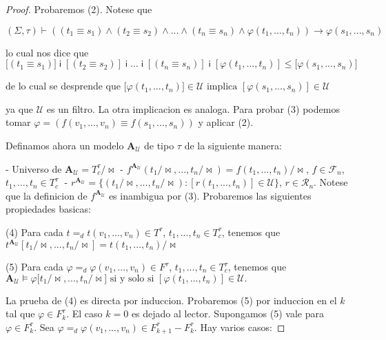 \begin{proof}
    Probaremos (2). Notese que

    \(\displaystyle (\Sigma ,\tau )\vdash \left( (t_{1}\equiv s_{1})\wedge (t_{2}\equiv s_{2})\wedge ...\wedge (t_{n}\equiv s_{n})\wedge \varphi (t_{1},...,t_{n})\right) \rightarrow \varphi (s_{1},...,s_{n}) \)

    lo cual nos dice que
    \(\displaystyle \lbrack (t_{1}\equiv s_{1})]\;\mathsf{i\;}[(t_{2}\equiv s_{2})]\;\mathsf{i\;} ...\;\mathsf{i\;}[(t_{n}\equiv s_{n})]\;\mathsf{i\;}[\varphi (t_{1},...,t_{n})]\leq \lbrack \varphi (s_{1},...,s_{n})] \)

    de lo cual se desprende que
    \(\displaystyle \lbrack \varphi (t_{1},...,t_{n})]\in \mathcal{U}\text{ implica }[\varphi (s_{1},...,s_{n})]\in \mathcal{U} \)

    ya que \(\mathcal{U}\) es un filtro. La otra implicacion es analoga.
    Para probar (3) podemos tomar \(\varphi =\left( f(v_{1},...,v_{n})\equiv f(s_{1},...,s_{n})\right) \) y aplicar (2).

    Definamos ahora un modelo \(\mathbf{A}_{\mathcal{U}}\) de tipo \(\tau \) de la siguiente manera:

    - Universo de \(\mathbf{A}_{\mathcal{U}}=T_{c}^{\tau }/\mathrm{\bowtie }\)
    - \(f^{\mathbf{A}_{\mathcal{U}}}(t_{1}/\mathrm{\bowtie },...,t_{n}/ \mathrm{\bowtie })=f(t_{1},...,t_{n})/\mathrm{\bowtie }\), \(f\in \mathcal{F} _{n}\), \(t_{1},...,t_{n}\in T_{c}^{\tau }\;\)
    - \(r^{\mathbf{A}_{\mathcal{U}}}=\{(t_{1}/\mathrm{\bowtie },...,t_{n}/ \mathrm{\bowtie }):[r(t_{1},...,t_{n})]\in \mathcal{U}\}\), \(r\in \mathcal{R} _{n}.\)
    Notese que la definicion de \(f^{\mathbf{A}_{\mathcal{U}}}\) es inambigua por (3). Probaremos las siguientes propiedades basicas:

    (4) Para cada \(t=_{d}t(v_{1},...,v_{n})\in T^{\tau }\), \( t_{1},...,t_{n}\in T_{c}^{\tau }\), tenemos que
    \(\displaystyle t^{\mathbf{A}_{\mathcal{U}}}[t_{1}/\mathrm{\bowtie },...,t_{n}/\mathrm{ \bowtie }]=t(t_{1},...,t_{n})/\mathrm{\bowtie } \)

    (5) Para cada \(\varphi =_{d}\varphi (v_{1},...,v_{n})\in F^{\tau }\), \( t_{1},...,t_{n}\in T_{c}^{\tau }\), tenemos que
    \(\displaystyle \mathbf{A}_{\mathcal{U}}\models \varphi \lbrack t_{1}/\mathrm{\bowtie } ,...,t_{n}/\mathrm{\bowtie }]\text{ si y solo si }[\varphi (t_{1},...,t_{n})]\in \mathcal{U}. \)

    La prueba de (4) es directa por induccion. Probaremos (5) por induccion en el \(k\) tal que \(\varphi \in F_{k}^{\tau }\). El caso \(k=0\) es dejado al lector. Supongamos (5) vale para \(\varphi \in F_{k}^{\tau }\). Sea \(\varphi =_{d}\varphi (v_{1},...,v_{n})\in F_{k+1}^{\tau }-F_{k}^{\tau }.\) Hay varios casos:


\end{proof}
